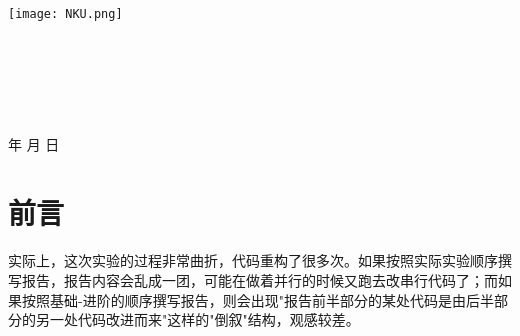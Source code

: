 \documentclass[a4paper]{article}
\newcommand{\HRule}{\rule{\linewidth}{0.5mm}}%
\begin{document}
\renewcommand{\contentsname}{目\ 录}
\renewcommand{\appendixname}{附录}
\renewcommand{\appendixpagename}{附录}
\renewcommand{\refname}{参考文献} 
\renewcommand{\figurename}{图}
\renewcommand{\tablename}{表}
\renewcommand{\today}{\number\year 年 \number\month 月 \number\day 日}

\begin{titlepage}
    \begin{center}
    \texttt{[image: NKU.png]}\\[1cm]
    \vspace{20mm}
		\textbf{\huge\textbf{}}\\[0.5cm]
		\textbf{\huge{}}\\[2.3cm]
		\textbf{\Huge\textbf{}}

		\vspace{\fill}
    
    \centering
    \textsc{\LARGE {}}\\[0.5cm]
    \textsc{\LARGE {}}\\[0.5cm]
    \textsc{\LARGE {}}\\[0.5cm]
    
    \vfill
    {\Large \today}
    \end{center}
\end{titlepage}

\renewcommand {\thefigure}{\thesection{}.\arabic{figure}}%
\renewcommand{\figurename}{图}
\renewcommand{\contentsname}{目录}  


\clearpage
\tableofcontents
\newpage

\section{前言}

实际上，这次实验的过程非常曲折，代码重构了很多次。如果按照实际实验顺序撰写报告，报告内容会乱成一团，可能在做着并行的时候又跑去改串行代码了；而如果按照基础-进阶的顺序撰写报告，则会出现"报告前半部分的某处代码是由后半部分的另一处代码改进而来"这样的"倒叙"结构，观感较差。
\end{document}
